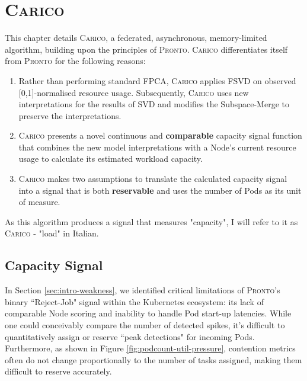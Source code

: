 \chapter{\protect\textsc{Carico}}
This chapter details \textsc{Carico}, a federated, asynchronous,
memory-limited algorithm, building upon the principles of \textsc{Pronto}.
\textsc{Carico} differentiates itself from \textsc{Pronto} for the following
reasons:
\begin{enumerate}
    \item Rather than performing standard FPCA, \textsc{Carico} applies FSVD on
        observed [0,1]-normalised resource usage. Subsequently, \textsc{Carico} uses
        new interpretations for the results of SVD and modifies the
        Subspace-Merge to preserve the interpretations.
    \item \textsc{Carico} presents a novel continuous and \textbf{comparable}
        capacity signal function that combines the new model interpretations
        with a Node's current resource usage to calculate its estimated
        workload capacity.
    \item \textsc{Carico} makes two assumptions to translate the calculated
        capacity signal into a signal that is both \textbf{reservable} and uses
        the number of Pods as its unit of measure.
\end{enumerate}
As this algorithm produces a signal that measures "capacity", I will refer to it
as \textsc{Carico} - "load" in Italian.

\section{Capacity Signal}
In Section \ref{sec:intro-weakness}, we identified critical limitations of
\textsc{Pronto}'s binary ``Reject-Job" signal within the Kubernetes ecosystem:
its lack of comparable Node scoring and inability to handle Pod start-up
latencies. While one could conceivably compare the number of detected spikes,
it's difficult to quantitatively assign or reserve ``peak detections" for
incoming Pods. Furthermore, as shown in Figure
\ref{fig:podcount-util-pressure}, contention metrics often do not change
proportionally to the number of tasks assigned, making them difficult to
reserve accurately.

